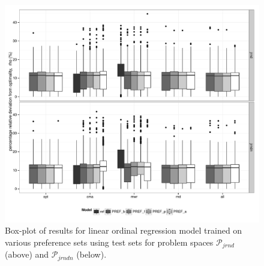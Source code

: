 \documentclass[letterpaper]{article}
\begin{document}
\begin{figure}[t]\centering 
\includegraphics[width=\columnwidth]{figures/boxplot} 
\caption{Box-plot of results for linear ordinal regression model trained on various preference sets using test sets for problem spaces $\mathcal{P}_{jrnd}$ (above) and $\mathcal{P}_{jrndn}$ (below).  }
\label{fig:results}
\end{figure}
 
\end{document}
